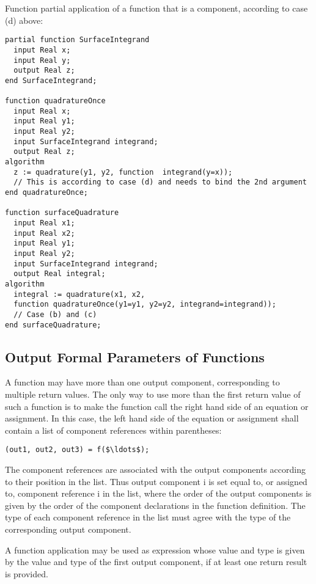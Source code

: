 \begin{example}
Function partial application of a function that is a component, according to case (d) above:
\begin{lstlisting}[language=modelica]
partial function SurfaceIntegrand
  input Real x;
  input Real y;
  output Real z;
end SurfaceIntegrand;

function quadratureOnce
  input Real x;
  input Real y1;
  input Real y2;
  input SurfaceIntegrand integrand;
  output Real z;
algorithm
  z := quadrature(y1, y2, function  integrand(y=x));
  // This is according to case (d) and needs to bind the 2nd argument
end quadratureOnce;

function surfaceQuadrature
  input Real x1;
  input Real x2;
  input Real y1;
  input Real y2;
  input SurfaceIntegrand integrand;
  output Real integral;
algorithm
  integral := quadrature(x1, x2,
  function quadratureOnce(y1=y1, y2=y2, integrand=integrand));
  // Case (b) and (c)
end surfaceQuadrature;
\end{lstlisting}
\end{example}

\subsection{Output Formal Parameters of Functions}\label{output-formal-parameters-of-functions}

A function may have more than one output component, corresponding to
multiple return values. The only way to use more than the first return
value of such a function is to make the function call the right hand
side of an equation or assignment. In this case, the left hand side of
the equation or assignment shall contain a list of component references
within parentheses:

\lstinline!(out1, out2, out3) = f($\ldots$);!

The component references are associated with the output components
according to their position in the list. Thus output component i is set
equal to, or assigned to, component reference i in the list, where the
order of the output components is given by the order of the component
declarations in the function definition. The type of each component
reference in the list must agree with the type of the corresponding
output component.

A function application may be used as expression whose value and type is
given by the value and type of the first output component, if at least
one return result is provided.

